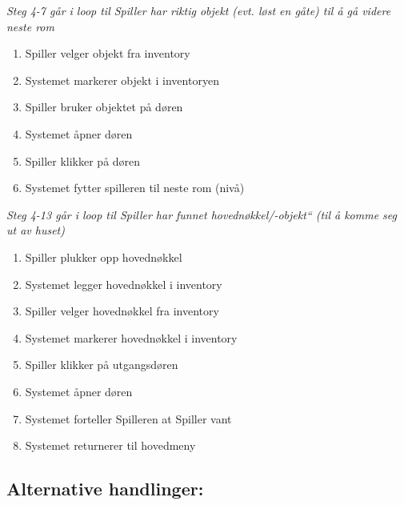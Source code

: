 \documentclass[12pt]{report}
\begin{document}
\textit{Steg 4-7 g{\aa}r i loop til Spiller har riktig objekt (evt. l{\o}st en g{\aa}te) til {\aa} g{\aa} videre neste
rom}

\begin{enumerate}[resume]
\item Spiller velger objekt fra inventory
\item Systemet markerer objekt i inventoryen
\item Spiller bruker objektet p{\aa} d{\o}ren
\item Systemet {\aa}pner d{\o}ren
\item Spiller klikker p{\aa} d{\o}ren
\item Systemet fytter spilleren til neste rom (niv{\aa})
\end{enumerate}

\textit{Steg 4-13 g{\aa}r i loop til Spiller har funnet {\textquotedbl}hovedn{\o}kkel/-objekt`` (til {\aa} komme seg ut
av huset)}

\begin{enumerate}[resume]
\item Spiller plukker opp {\textquotedbl}hovedn{\o}kkel{\textquotedbl}
\item Systemet legger {\textquotedbl}hovedn{\o}kkel{\textquotedbl} i inventory
\item Spiller velger {\textquotedbl}hovedn{\o}kkel{\textquotedbl} fra inventory
\item Systemet markerer {\textquotedbl}hovedn{\o}kkel{\textquotedbl} i inventory
\item Spiller klikker p{\aa} utgangsd{\o}ren
\item Systemet {\aa}pner d{\o}ren
\item Systemet forteller Spilleren at Spiller vant
\item Systemet returnerer til hovedmeny
\end{enumerate}

\subsection*{Alternative handlinger:}
\end{document}
